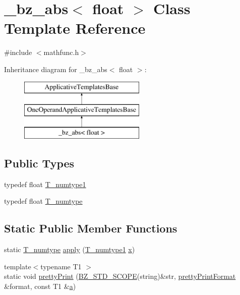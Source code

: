 \hypertarget{class__bz__abs_3_01float_01_4}{}\section{\+\_\+bz\+\_\+abs$<$ float $>$ Class Template Reference}
\label{class__bz__abs_3_01float_01_4}


{\ttfamily \#include $<$mathfunc.\+h$>$}

Inheritance diagram for \+\_\+bz\+\_\+abs$<$ float $>$\+:\begin{figure}[H]
\begin{center}
\leavevmode
\includegraphics[height=3.000000cm]{class__bz__abs_3_01float_01_4}
\end{center}
\end{figure}
\subsection*{Public Types}
\begin{DoxyCompactItemize}
\item 
typedef float \hyperlink{class__bz__abs_3_01float_01_4_a6c4d8b88ce205205481d518882ba350a}{T\+\_\+numtype1}
\item 
typedef float \hyperlink{class__bz__abs_3_01float_01_4_ad57728a1bb3d7393987185e6822448b0}{T\+\_\+numtype}
\end{DoxyCompactItemize}
\subsection*{Static Public Member Functions}
\begin{DoxyCompactItemize}
\item 
static \hyperlink{class__bz__abs_3_01float_01_4_ad57728a1bb3d7393987185e6822448b0}{T\+\_\+numtype} \hyperlink{class__bz__abs_3_01float_01_4_af3dc86acc76c0bf8afda9fef6d5a72f3}{apply} (\hyperlink{class__bz__abs_3_01float_01_4_a6c4d8b88ce205205481d518882ba350a}{T\+\_\+numtype1} \hyperlink{vecnorm1_8cc_ac73eed9e41ec09d58f112f06c2d6cb63}{x})
\item 
{\footnotesize template$<$typename T1 $>$ }\\static void \hyperlink{class__bz__abs_3_01float_01_4_a29c73d78a835831320f3e275309b4184}{pretty\+Print} (\hyperlink{numinquire_8h_a2b24ffc3b4ef9803956bc7715c6c7b83}{B\+Z\+\_\+\+S\+T\+D\+\_\+\+S\+C\+O\+P\+E}(string)\&str, \hyperlink{classprettyPrintFormat}{pretty\+Print\+Format} \&format, const T1 \&\hyperlink{gen__mat5files_8m_aae328bf20413f220e38aec4d95bfd6da}{a})
\end{DoxyCompactItemize}


